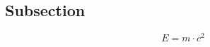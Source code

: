 \subsection{Subsection} \label{sec:subsection1}

\lipsum[2-4]
\cite{latexcompanion}

\begin{equation}\label{eqn:test}
  E = m \cdot c^{2}
\end{equation}
